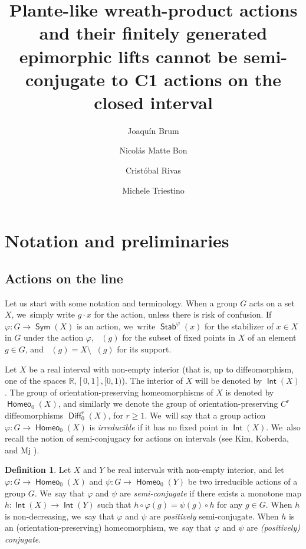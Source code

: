 \documentclass[10pt]{amsart}
\theoremstyle{definition}
\newtheorem{dfn}[thm]{Definition}
\DeclareMathOperator{\Bij}{\mathsf{Sym}}
\DeclareMathOperator{\Diff}{\mathsf{Diff}}
\DeclareMathOperator{\fixphi}{\mathsf{Fix}^\varphi}
\DeclareMathOperator{\homeo}{\mathsf{Homeo}}
\DeclareMathOperator{\Int}{\mathsf{Int}}
\DeclareMathOperator{\stab}{\mathsf{Stab}}
\DeclareMathOperator{\suppphi}{\mathsf{Supp}^\varphi}
\newcommand{\R}{\mathbb{R}}
\begin{document}
\title{Plante-like wreath-product actions and their finitely generated epimorphic lifts cannot be semi-conjugate to C1 actions on the closed interval}
\author{Joaquín Brum \and Nicolás Matte Bon \and Cristóbal Rivas \and Michele Triestino}
\maketitle
\setcounter{section}{1}
\section{Notation and preliminaries}
\subsection{Actions on the line}\label{sc.preliminary-actions}
Let us start with some notation and terminology. When a group $G$ acts on a set $X$, we~simply write $g\cdot x$ for the action, unless there is risk of confusion. If~$\varphi\colon G\to \Bij(X)$ is an action, we~write $\stab^\varphi(x)$ for the stabilizer of $x\in X$ in $G$ under the action $\varphi$, $\fixphi(g)$ for the subset of fixed points in $X$ of an element $g\in G$, and $\suppphi(g)=X\setminus \fixphi(g)$ for its support.

Let $X$ be a real interval with non-empty interior (that is, up to diffeomorphism, one of the spaces $\R, [0,1], [0, 1)$). The interior of $X$ will be denoted by $\Int(X)$. The group of orientation-preserving homeomorphisms of $X$ is denoted by $\homeo_0(X)$, and similarly we denote the group of orientation-preserving $C^r$ diffeomorphisms $\Diff_0^r(X)$, for $r\ge 1$. We~will say that a group action $\varphi\colon G\to \homeo_0(X)$ is \emph{irreducible} if it has no fixed point in $\Int(X)$. We~also recall the notion of semi-conjugacy for actions on intervals (see Kim, Koberda, and Mj \cite{KKMj}).
\begin{dfn}
Let $X$ and $Y$ be real intervals with non-empty interior, and let $\varphi\colon G\to \homeo_0(X)$ and $\psi\colon G\to \homeo_0(Y)$ be two irreducible actions of a group $G$. We~say that $\varphi$ and $\psi$ are \emph{semi-conjugate} if there exists a monotone map $h\colon \Int(X)\to \Int(Y)$ such that $h\circ\varphi(g)=\psi(g)\circ h$ for any $g\in G$. When $h$ is non-decreasing, we~say that $\varphi$ and $\psi$ are \emph{positively} semi-conjugate. When $h$ is an (orientation-preserving) homeomorphism, we~say that $\varphi$ and $\psi$ are \emph{(positively) conjugate}.
\end{dfn}
\end{document}

